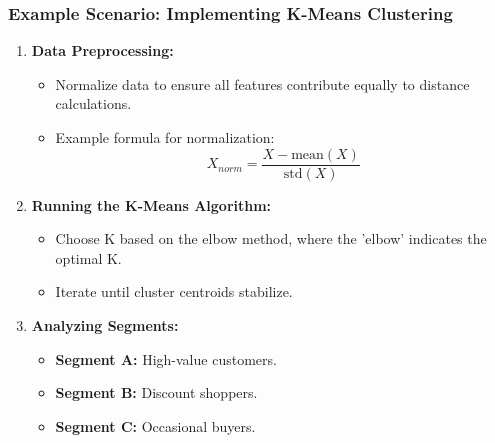 \documentclass[aspectratio=169]{beamer}
\begin{document}
\begin{frame}[fragile]
    \frametitle{Example Scenario: Implementing K-Means Clustering}
    
    \begin{enumerate}
        \item \textbf{Data Preprocessing:}
              \begin{itemize}
                  \item Normalize data to ensure all features contribute equally to distance calculations.
                  \item Example formula for normalization:
                  \begin{equation}
                    X_{norm} = \frac{X - \text{mean}(X)}{\text{std}(X)}
                  \end{equation}
              \end{itemize}
        
        \item \textbf{Running the K-Means Algorithm:}
              \begin{itemize}
                  \item Choose K based on the elbow method, where the 'elbow' indicates the optimal K.
                  \item Iterate until cluster centroids stabilize.
              \end{itemize}
        
        \item \textbf{Analyzing Segments:}
              \begin{itemize}
                  \item \textbf{Segment A:} High-value customers.
                  \item \textbf{Segment B:} Discount shoppers.
                  \item \textbf{Segment C:} Occasional buyers.
              \end{itemize}
    \end{enumerate}
\end{frame}
\end{document}
